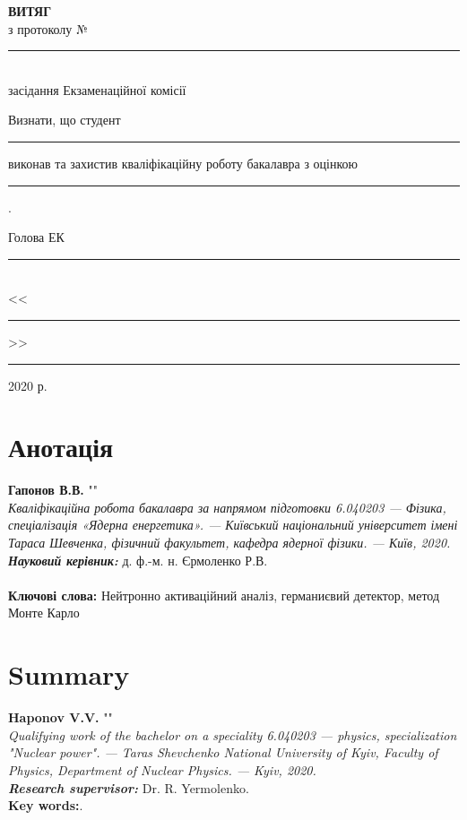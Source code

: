 \documentclass[a4paper, 14pt]{article}
\numberwithin{equation}{section}
\numberwithin{table}{section}
\begin{document}
\begin{titlepage}
\renewcommand{\baselinestretch}{1.0}
\newcommand{\ul}[1]{\rule{#1}{0.1pt}}
	\begin{spacing}{1.8}
		\vspace*{4.5cm}
		{\center
		{\bf ВИТЯГ}\\
		з протоколу № \ul{2.4cm}\\
		засідання Екзаменаційної комісії\\[2cm]}
		{\noindent
		Визнати, що студент \ul{7.2cm} виконав та захистив кваліфікаційну роботу бакалавра з оцінкою \ul{7.2cm} .\\[1cm]}
		{\flushright
		Голова ЕК \ul{7.8cm}\\
		<<\ul{1cm}>> \ul{4cm} 2020 р.\\}
	\end{spacing}
\end{titlepage}


\pagestyle{empty}

\section*{Анотація}

{\bf Гапонов В.В.} ""\\
{\itshape Кваліфікаційна робота бакалавра за напрямом підготовки 6.040203 --- Фізика, спеціалізація «Ядерна енергетика». --- Київський національний університет імені Тараса Шевченка, фізичний факультет, кафедра ядерної фізики. --- Київ, 2020.} \\
{\itshape \bfseries Науковий керівник:} д. ф.-м. н. Єрмоленко Р.В.%
\\[0.5cm]
\\
{\bf Ключові слова:} Нейтронно активаційний аналіз, германиєвий детектор, метод Монте Карло\\   

\newpage
\thispagestyle{empty}
\section*{Summary}

{\bf Haponov V.V.} ""\\
{\itshape Qualifying work of the bachelor on a speciality 6.040203 --- physics, specialization "Nuclear power". --- Taras Shevchenko National University of Kyiv, Faculty of Physics, Department of Nuclear Physics. --- Kyiv, 2020.\\}
{\itshape \bfseries Research supervisor:} Dr. R. Yermolenko.
\\[0.5cm]
{\bf Key words:}.
\end{document}
